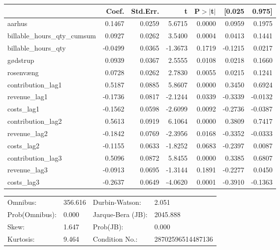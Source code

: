 \begin{table}
\begin{center}
\begin{tabular}{lrrrrrr}
\hline
                             &   Coef. & Std.Err. &       t & P$> |$t$|$ &  [0.025 &  0.975]  \\
\hline
aarhus                       &  0.1467 &   0.0259 &  5.6715 &      0.0000 &  0.0959 &  0.1975  \\
billable\_hours\_qty\_cumsum &  0.0927 &   0.0262 &  3.5400 &      0.0004 &  0.0413 &  0.1441  \\
billable\_hours\_qty         & -0.0499 &   0.0365 & -1.3673 &      0.1719 & -0.1215 &  0.0217  \\
gødstrup                     &  0.0939 &   0.0367 &  2.5555 &      0.0108 &  0.0218 &  0.1660  \\
rosenvæng                    &  0.0728 &   0.0262 &  2.7830 &      0.0055 &  0.0215 &  0.1241  \\
contribution\_lag1           &  0.5187 &   0.0885 &  5.8607 &      0.0000 &  0.3450 &  0.6924  \\
revenue\_lag1                & -0.1736 &   0.0817 & -2.1244 &      0.0339 & -0.3339 & -0.0132  \\
costs\_lag1                  & -0.1562 &   0.0598 & -2.6099 &      0.0092 & -0.2736 & -0.0387  \\
contribution\_lag2           &  0.5613 &   0.0919 &  6.1064 &      0.0000 &  0.3809 &  0.7417  \\
revenue\_lag2                & -0.1842 &   0.0769 & -2.3956 &      0.0168 & -0.3352 & -0.0333  \\
costs\_lag2                  & -0.1155 &   0.0633 & -1.8252 &      0.0683 & -0.2397 &  0.0087  \\
contribution\_lag3           &  0.5096 &   0.0872 &  5.8455 &      0.0000 &  0.3385 &  0.6807  \\
revenue\_lag3                & -0.0913 &   0.0695 & -1.3144 &      0.1891 & -0.2277 &  0.0450  \\
costs\_lag3                  & -0.2637 &   0.0649 & -4.0620 &      0.0001 & -0.3910 & -0.1363  \\
\hline
\end{tabular}
\end{center}

\begin{center}
\begin{tabular}{llll}
\hline
Omnibus:       & 356.616 & Durbin-Watson:    & 2.051              \\
Prob(Omnibus): & 0.000   & Jarque-Bera (JB): & 2045.888           \\
Skew:          & 1.647   & Prob(JB):         & 0.000              \\
Kurtosis:      & 9.464   & Condition No.:    & 28702596514487136  \\
\hline
\end{tabular}
\end{center}
\end{table}
